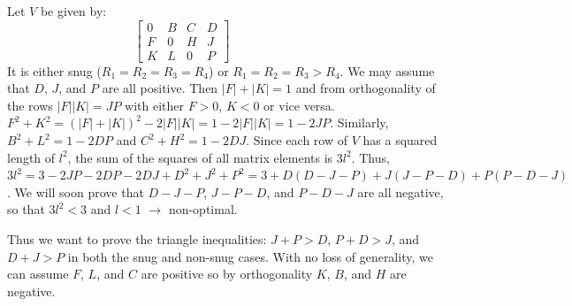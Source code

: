 Let $V$ be given by:
\begin{equation*}
\begin{bmatrix}
0 & B & C & D \\
F & 0 & H & J \\
K & L & 0 & P
\end{bmatrix}
~~~~~~~~~~~~~~~~~~~~~~~~~~~~~~~~~~~
\end{equation*}
It is either snug ($R_1 = R_2 = R_3 = R_4$) or $R_1 = R_2 = R_3 > R_4$.  We
may assume that $D$, $J$, and $P$ are all positive.  Then $|F|+|K|=1$ and from
orthogonality of the rows $|F||K| = JP$ with either $F > 0$, $K < 0$ or vice
versa.  $F^2+K^2 = (|F|+|K|)^2 - 2|F||K| = 1-2|F||K| = 1-2JP$.  Similarly,
$B^2+L^2 = 1-2DP$ and $C^2+H^2=1-2DJ$.  Since each row of $V$ has a squared
length of $l^2$, the sum of the squares of all matrix elements is $3l^2$.
Thus, $3l^2 = 3-2JP-2DP-2DJ+D^2+J^2+P^2 = 3+D(D-J-P)+J(J-P-D)+P(P-D-J)$.  We
will soon prove that $D-J-P$, $J-P-D$, and $P-D-J$ are all negative, so that
$3l^2 < 3$ and $l < 1$ $\rightarrow$ non-optimal.

Thus we want to prove the triangle inequalities: $J+P>D$, $P+D>J$, and $D+J>P$
in both the snug and non-snug cases.  With no loss of generality, we can
assume $F$, $L$, and $C$ are positive so by orthogonality $K$, $B$, and $H$
are negative.

